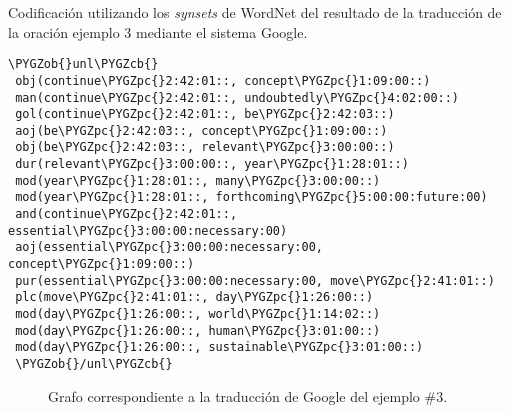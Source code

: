 \documentclass[a4paper,12pt,spanish]{book}
\def\PYGZob{\char`\{}
\def\PYGZcb{\char`\}}
\def\PYGZpc{\char`\%}
\begin{document}
\begin{literal-block}
\caption{Codificación utilizando los \emph{synsets} de WordNet del resultado de la traducción de la oración ejemplo 3 mediante el sistema Google.}
\begin{Verbatim}[commandchars=\\\{\}]
 \PYGZob{}unl\PYGZcb{}
 obj(continue\PYGZpc{}2:42:01::, concept\PYGZpc{}1:09:00::)
 man(continue\PYGZpc{}2:42:01::, undoubtedly\PYGZpc{}4:02:00::)
 gol(continue\PYGZpc{}2:42:01::, be\PYGZpc{}2:42:03::)
 aoj(be\PYGZpc{}2:42:03::, concept\PYGZpc{}1:09:00::)
 obj(be\PYGZpc{}2:42:03::, relevant\PYGZpc{}3:00:00::)
 dur(relevant\PYGZpc{}3:00:00::, year\PYGZpc{}1:28:01::)
 mod(year\PYGZpc{}1:28:01::, many\PYGZpc{}3:00:00::)
 mod(year\PYGZpc{}1:28:01::, forthcoming\PYGZpc{}5:00:00:future:00)
 and(continue\PYGZpc{}2:42:01::, essential\PYGZpc{}3:00:00:necessary:00)
 aoj(essential\PYGZpc{}3:00:00:necessary:00, concept\PYGZpc{}1:09:00::)
 pur(essential\PYGZpc{}3:00:00:necessary:00, move\PYGZpc{}2:41:01::)
 plc(move\PYGZpc{}2:41:01::, day\PYGZpc{}1:26:00::)
 mod(day\PYGZpc{}1:26:00::, world\PYGZpc{}1:14:02::)
 mod(day\PYGZpc{}1:26:00::, human\PYGZpc{}3:01:00::)
 mod(day\PYGZpc{}1:26:00::, sustainable\PYGZpc{}3:01:00::)
 \PYGZob{}/unl\PYGZcb{}
\end{Verbatim}
\label{5.pruebas/index:code-example-google-3}
\end{literal-block}
\begin{figure}[htbp]
\centering
\capstart

\caption{Grafo correspondiente a la traducción de Google del ejemplo \#3.}\label{5.pruebas/index:sample03-google}\end{figure}
\end{document}
